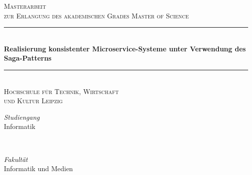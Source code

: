 %
%
%
% 
%
	\begin{titlepage} 
		\newcommand{\HRule}{\rule{\linewidth}{0.5mm}}
		
		\center
		
		
		\textsc{\LARGE Masterarbeit}\\[1cm] 
		
		\textsc{\Large zur Erlangung des akademischen Grades Master of Science}\\[1cm]
		
		
		\HRule\\[0.4cm]

		{\huge\bfseries Realisierung konsistenter Microservice-Systeme unter Verwendung des Saga-Patterns}\\[0.4cm]
		
		\HRule\\[1.5cm]
		
		\textsc{\Large Hochschule für Technik, Wirtschaft\\und Kultur Leipzig}\\[1.5cm] %
		
		\begin{minipage}{0.4\textwidth}
			\begin{flushleft}
				\large
				\textit{Studiengang}\\
				\textsc{}Informatik
			\end{flushleft}
		\end{minipage}
		~
		\begin{minipage}{0.4\textwidth}
			\begin{flushright}
				\large
				\textit{Fakultät}\\
				\textsc{}Informatik und Medien
			\end{flushright}
		\end{minipage}
		

\end{titlepage}
